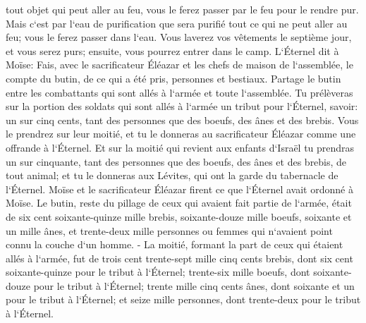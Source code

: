 \verse tout objet qui peut aller au feu, vous le ferez passer par le feu pour le rendre pur. Mais c`est par l`eau de purification que sera purifié tout ce qui ne peut aller au feu; vous le ferez passer dans l`eau. 
\verse Vous laverez vos vêtements le septième jour, et vous serez purs; ensuite, vous pourrez entrer dans le camp. 
\verse L`Éternel dit à Moïse: 
\verse Fais, avec le sacrificateur Éléazar et les chefs de maison de l`assemblée, le compte du butin, de ce qui a été pris, personnes et bestiaux. 
\verse Partage le butin entre les combattants qui sont allés à l`armée et toute l`assemblée. 
\verse Tu prélèveras sur la portion des soldats qui sont allés à l`armée un tribut pour l`Éternel, savoir: un sur cinq cents, tant des personnes que des boeufs, des ânes et des brebis. 
\verse Vous le prendrez sur leur moitié, et tu le donneras au sacrificateur Éléazar comme une offrande à l`Éternel. 
\verse Et sur la moitié qui revient aux enfants d`Israël tu prendras un sur cinquante, tant des personnes que des boeufs, des ânes et des brebis, de tout animal; et tu le donneras aux Lévites, qui ont la garde du tabernacle de l`Éternel. 
\verse Moïse et le sacrificateur Éléazar firent ce que l`Éternel avait ordonné à Moïse. 
\verse Le butin, reste du pillage de ceux qui avaient fait partie de l`armée, était de six cent soixante-quinze mille brebis, 
\verse soixante-douze mille boeufs, 
\verse soixante et un mille ânes, 
\verse et trente-deux mille personnes ou femmes qui n`avaient point connu la couche d`un homme. - 
\verse La moitié, formant la part de ceux qui étaient allés à l`armée, fut de trois cent trente-sept mille cinq cents brebis, 
\verse dont six cent soixante-quinze pour le tribut à l`Éternel; 
\verse trente-six mille boeufs, dont soixante-douze pour le tribut à l`Éternel; 
\verse trente mille cinq cents ânes, dont soixante et un pour le tribut à l`Éternel; 
\verse et seize mille personnes, dont trente-deux pour le tribut à l`Éternel. 
